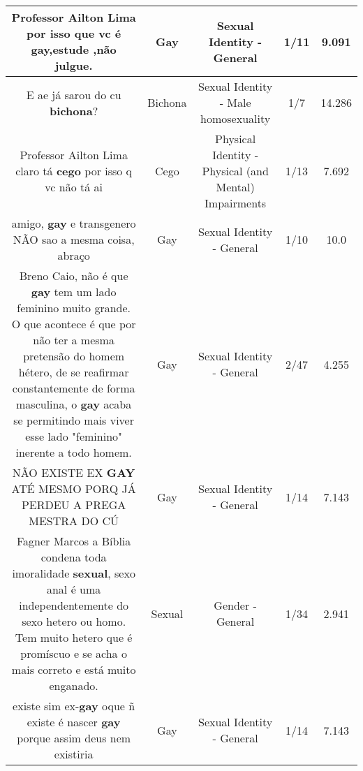 \documentclass[11pt]{article}
\newlength\mylength
\begin{document}
\begin{center}
\begin{longtable}{|C{.65\mylength}|C{.30\mylength}|C{.12\mylength}|C{.12\mylength}|C{.12\mylength}|}
  \small Professor Ailton Lima por isso que vc é \textbf{gay},estude ,não julgue.\normalsize   & Gay & Sexual Identity - General & 1/11 & 9.091 \\  \hline
  \small E ae já sarou do cu \textbf{bichona}?\normalsize   & Bichona & Sexual Identity - Male homosexuality & 1/7 & 14.286 \\  \hline
  \small Professor Ailton Lima claro tá \textbf{cego} por isso q vc não tá ai\normalsize   & Cego & Physical Identity - Physical (and Mental) Impairments & 1/13 & 7.692 \\  \hline
  \small amigo, \textbf{gay} e transgenero NÃO sao a mesma coisa, abraço\normalsize   & Gay & Sexual Identity - General & 1/10 & 10.0 \\  \hline
  \small Breno Caio, não é que \textbf{gay} tem um lado feminino muito grande. O que acontece é que por não ter a mesma pretensão do homem hétero, de se reafirmar constantemente de forma masculina, o \textbf{gay} acaba se permitindo mais viver esse lado "feminino" inerente a todo homem.\normalsize   & Gay & Sexual Identity - General & 2/47 & 4.255 \\  \hline
  \small NÃO EXISTE EX \textbf{GAY} ATÉ MESMO PORQ JÁ PERDEU A PREGA MESTRA DO CÚ\normalsize   & Gay & Sexual Identity - General & 1/14 & 7.143 \\  \hline
  \small Fagner Marcos a Bíblia condena toda imoralidade \textbf{sexual}, sexo anal é uma independentemente do sexo hetero ou homo. Tem muito hetero que é promíscuo e se acha o mais correto e está muito enganado.\normalsize   & Sexual & Gender - General & 1/34 & 2.941 \\  \hline
  \small existe sim ex-\textbf{gay} oque ñ existe é nascer \textbf{gay} porque assim deus nem existiria\normalsize   & Gay & Sexual Identity - General & 1/14 & 7.143 \\  \hline

\end{longtable}
\end{center}
\end{document}
